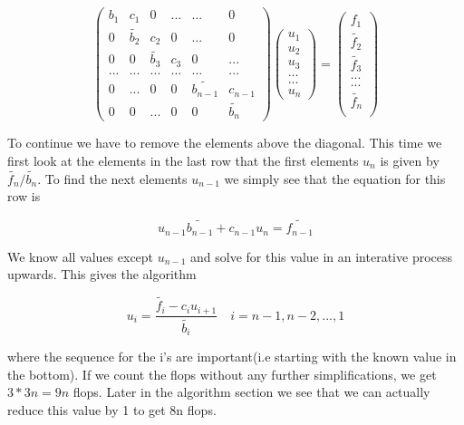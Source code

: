 \documentclass[a4paper,11pt]{article}
\begin{document}
{\begin{equation}
\begin{pmatrix}
b_1 & c_1 & 0 & ... & ... & 0 \\
0 & \tilde{b_2} & c_2 & 0 & ... & 0 \\
0 & 0 & \tilde{b_3} & c_3 & 0 & ... \\
... & ... & ... & ... & ... & ... \\
0 & ... & 0 & 0 & \tilde{b_{n-1}} & c_{n-1} \\
0 & 0 & ... & 0 & 0 & \tilde{b_{n}}
\end{pmatrix} \begin{pmatrix}
u_1\\
u_2\\
u_3\\
...\\
...\\
u_n
\end{pmatrix} = \begin{pmatrix}
f_1 \\
\tilde{f_2} \\
\tilde{f_3} \\
... \\
... \\
\tilde{f_n} \\
\end{pmatrix}
\end{equation}
		
To continue we have to remove the elements above the diagonal. This time we first look at the elements in the last row that the first elements $u_n$ is given by $\tilde{f_n}/\tilde{b_n}$. To find the next elements $u_{n-1}$ we simply see that the equation for this row is 
		
\begin{equation}
u_{n-1}\tilde{b_{n-1}}+c_{n-1}u_n = \tilde{f_{n-1}}
\end{equation}
		
We know all values except $u_{n-1}$ and solve for this value in an interative process upwards. This gives the algorithm 
		
\begin{equation}
u_i = \frac{\tilde{f_i}-c_i u_{i+1}}{\tilde{b_i}}\quad i = n-1, n-2, ..., 1
\label{eq:forward_general_u}
\end{equation}
	
where the sequence for the i's are important(i.e starting with the known value in the bottom). If we count the flops without any further simplifications, we get $3*3n=9n$ flops. Later in the algorithm section we see that we can actually reduce this value by 1 to get 8n flops. 
		
}
\end{document}
